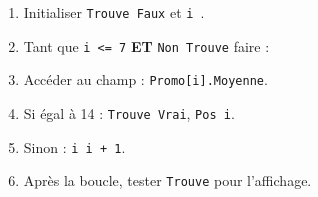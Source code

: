 \documentclass[11pt]{article}
\begin{document}
\begin{methode}
\begin{enumerate}
    \item Initialiser \texttt{Trouve \textleftarrow Faux} et \texttt{i }.
    \item Tant que \texttt{i \textless= 7} \textbf{ET} \texttt{Non Trouve} faire :
    \item \quad Accéder au champ : \texttt{Promo[i].Moyenne}.
    \item \quad Si égal à 14 : \texttt{Trouve \textleftarrow Vrai}, \texttt{Pos \textleftarrow i}.
    \item \quad Sinon : \texttt{i \textleftarrow i + 1}.
    \item Après la boucle, tester \texttt{Trouve} pour l'affichage.
\end{enumerate}
\end{methode}
\end{document}
